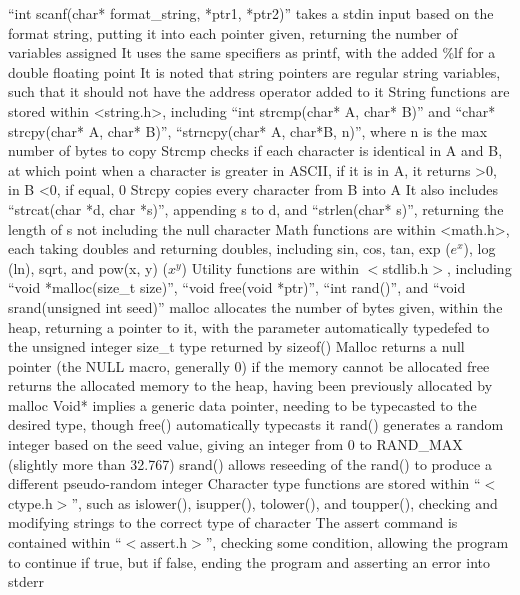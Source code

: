 \documentclass[11 pt, twoside]{article}
\newenvironment{outline*}
{
	\begin{outline}[enumerate]
	}
	{\end{outline}
}
\begin{document}
\begin{outline*}
\2 ``int scanf(char* format\_string, *ptr1, *ptr2)'' takes a stdin input based on the format string, putting it into each pointer given, returning the number of variables assigned
\3 It uses the same specifiers as printf, with the added \%lf for a double floating point
\3 It is noted that string pointers are regular string variables, such that it should not have the address operator added to it
\1 String functions are stored within <string.h>, including ``int strcmp(char* A, char* B)'' and ``char* strcpy(char* A, char* B)'', ``strncpy(char* A, char*B, n)'', where n is the max number of bytes to copy
\2 Strcmp checks if each character is identical in A and B, at which point when a character is greater in ASCII, if it is in A, it returns >0, in B <0, if equal, 0
\2 Strcpy copies every character from B into A
\2 It also includes ``strcat(char *d, char *s)'', appending s to d, and ``strlen(char* s)'', returning the length of s not including the null character
\1 Math functions are within <math.h>, each taking doubles and returning doubles, including sin, cos, tan, exp ($e^x$), log (ln), sqrt, and pow(x, y) ($x^y$)
\1 Utility functions are within $<$stdlib.h$>$, including ``void *malloc(size\_t size)'', ``void free(void *ptr)'', ``int rand()'', and ``void srand(unsigned int seed)''
\2 malloc allocates the number of bytes given, within the heap, returning a pointer to it, with the parameter automatically typedefed to the unsigned integer size\_t type returned by sizeof()
\3 Malloc returns a null pointer (the NULL macro, generally 0) if the memory cannot be allocated
\3 free returns the allocated memory to the heap, having been previously allocated by malloc
\3 Void* implies a generic data pointer, needing to be typecasted to the desired type, though free() automatically typecasts it
\2 rand() generates a random integer based on the seed value, giving an integer from 0 to RAND\_MAX (slightly more than 32.767)
\3 srand() allows reseeding of the rand() to produce a different pseudo-random integer
\1 Character type functions are stored within ``$<$ctype.h$>$'', such as islower(), isupper(), tolower(), and toupper(), checking and modifying strings to the correct type of character
\1 The assert command is contained within ``$<$assert.h$>$'', checking some condition, allowing the program to continue if true, but if false, ending the program and asserting an error into stderr
\end{outline*}
\end{document}

